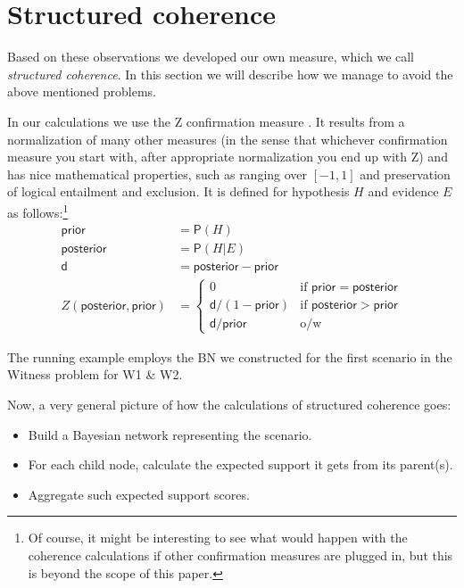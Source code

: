 \documentclass[10pt,]{scrartcl}
\newcommand{\pr}{\mathsf{P}}
\newcommand{\s}[1]{\mbox{\textsf{#1}}}
\begin{document}
\section{Structured coherence}\label{sec:structured}


Based on these observations we developed our own measure, which we call
\textit{structured coherence}. In this section we will describe how we
manage to avoid the above mentioned problems.  


In our calculations we use the \s{Z} confirmation measure \citep[see][for a detailed study and defense]{crupi2007BayesianMeasuresEvidential}. It results from a
normalization of many other measures (in the sense that whichever
confirmation measure you start with, after appropriate normalization you
end up with \s{Z}) and has nice mathematical properties, such as ranging
over \([-1,1]\) and preservation of logical entailment and exclusion. It
is defined for hypothesis \(H\) and evidence \(E\) as follows:\footnote{Of course, it might be interesting to see what would happen
with the coherence calculations if other confirmation measures are
plugged in, but this is beyond the scope of this paper.}
\begin{align*}
   \mathsf{prior} & = \pr(H) \\
   \mathsf{posterior} & = \pr(H \vert E)\\
   \mathsf{d} & = \mathsf{posterior} - \mathsf{prior} \\
       Z(\mathsf{posterior,prior}) & =  \begin{cases}
       0 & \text{if } \mathsf{prior} = \mathsf{posterior}\\
       \mathsf{d}/(1-\mathsf{prior}) & \text{if } \mathsf{posterior} > \mathsf{prior} \\
         \mathsf{d}/\mathsf{prior} & \text{o/w} 
       \end{cases}
   \end{align*}



 The running example employs the BN we
constructed for the first scenario in the \textsf{Witness} problem for \textsf{W1} \& \textsf{W2}.











Now, a very general picture of how the calculations of structured coherence  goes:

\begin{itemize}
    \item Build a Bayesian network representing the scenario.
    \item For each child node, calculate the expected support it gets from its parent(s). 
    \item Aggregate such expected support scores.
\end{itemize}
\end{document}
